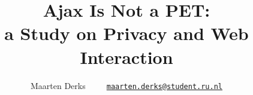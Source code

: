 \documentclass[a4paper]{article} %
\title{Ajax Is Not a PET:\\a Study on Privacy and Web Interaction}
\author{Maarten Derks~~~~~\href{mailto:maarten.derks@student.ru.nl}{\nolinkurl{maarten.derks@student.ru.nl}}}
\begin{document}
	
	\maketitle
	
	
	
	
	
	
		

    \nocite{*}
    
	
	
\end{document}

